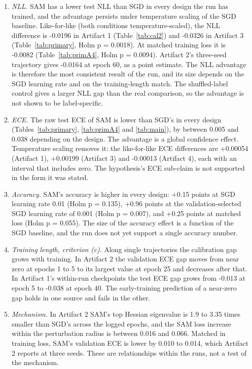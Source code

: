 \documentclass[11pt,letterpaper]{article}
\begin{document}
\begin{enumerate}
\item \emph{NLL.} SAM has a lower test NLL than SGD in every design the run has trained, and the advantage persists under temperature scaling of the SGD baseline. Like-for-like (both conditions temperature-scaled), the NLL difference is -0.0196 in Artifact 1 (Table~\ref{tab:cal2}) and -0.0326 in Artifact 3 (Table~\ref{tab:primary}, Holm p = 0.0018). At matched training loss it is -0.0082 (Table~\ref{tab:primA4}, Holm p = 0.0094). Artifact 2's three-seed trajectory gives -0.0164 at epoch 60, as a point estimate. The NLL advantage is therefore the most consistent result of the run, and its size depends on the SGD learning rate and on the training-length match. The shuffled-label control gives a larger NLL gap than the real comparison, so the advantage is not shown to be label-specific.
\item \emph{ECE.} The raw test ECE of SAM is lower than SGD's in every design (Tables~\ref{tab:primary}, \ref{tab:primA4} and \ref{tab:main}), by between 0.005 and 0.038 depending on the design. The advantage is a global confidence effect. Temperature scaling removes it: the like-for-like ECE differences are +0.00054 (Artifact 1), +0.00199 (Artifact 3) and -0.00013 (Artifact 4), each with an interval that includes zero. The hypothesis's ECE sub-claim is not supported in the form it was stated.
\item \emph{Accuracy.} SAM's accuracy is higher in every design: +0.15 points at SGD learning rate 0.01 (Holm p = 0.135), +0.96 points at the validation-selected SGD learning rate of 0.001 (Holm p = 0.007), and +0.25 points at matched loss (Holm p = 0.055). The size of the accuracy effect is a function of the SGD baseline, and the run does not yet support a single accuracy number.
\item \emph{Training length, criterion (c).} Along single trajectories the calibration gap grows with training. In Artifact 2 the validation ECE gap moves from near zero at epochs 1 to 5 to its largest value at epoch 25 and decreases after that. In Artifact 1's within-run checkpoints the test ECE gap grows from -0.013 at epoch 5 to -0.038 at epoch 40. The early-training prediction of a near-zero gap holds in one source and fails in the other.
\item \emph{Mechanism.} In Artifact 2 SAM's top Hessian eigenvalue is 1.9 to 3.35 times smaller than SGD's across the logged epochs, and the SAM loss increase within the perturbation radius is between 0.016 and 0.066. Matched in training loss, SAM's validation ECE is lower by 0.010 to 0.014, which Artifact 2 reports at three seeds. These are relationships within the runs, not a test of the mechanism.
\end{enumerate}
\end{document}

